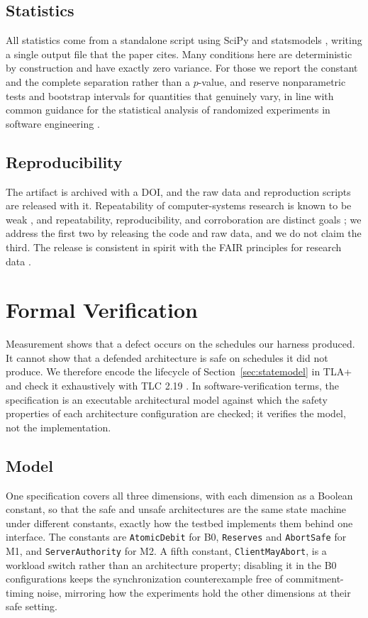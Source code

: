 \documentclass[preprint,3p,authoryear,12pt]{elsarticle}
\begin{document}
\subsection{Statistics}
All statistics come from a standalone script using SciPy \citep{scipy} and statsmodels
\citep{statsmodels}, writing a
single output file that the paper cites. Many conditions here are deterministic by
construction and have exactly zero variance. For those we report the constant and the
complete separation rather than a $p$-value, and reserve nonparametric tests and
bootstrap intervals \citep{efron} for quantities that genuinely vary, in line with common
guidance for the statistical analysis of randomized experiments in software engineering
\citep{arcuri}.

\subsection{Reproducibility}
The artifact is archived with a DOI, and the raw data and reproduction scripts are
released with it. Repeatability of computer-systems research is known to be weak
\citep{collberg}, and repeatability, reproducibility, and corroboration are distinct
goals \citep{feitelson}; we address the first two by releasing the code and raw data, and
we do not claim the third. The release is consistent in spirit with the FAIR principles
for research data \citep{fair}.

\section{Formal Verification}
\label{sec:formal}
Measurement shows that a defect occurs on the schedules our harness produced. It cannot
show that a defended architecture is safe on schedules it did not produce. We therefore
encode the lifecycle of Section~\ref{sec:statemodel} in TLA+ \citep{tla} and check it
exhaustively with TLC 2.19 \citep{tlc}. In software-verification terms, the specification
is an executable architectural model against which the safety properties of each
architecture configuration are checked; it verifies the model, not the implementation.

\subsection{Model}
One specification covers all three dimensions, with each dimension as a Boolean constant,
so that the safe and unsafe architectures are the same state machine under different
constants, exactly how the testbed implements them behind one interface. The constants
are \texttt{AtomicDebit} for B0, \texttt{Reserves} and \texttt{AbortSafe} for M1, and
\texttt{ServerAuthority} for M2. A fifth constant, \texttt{ClientMayAbort}, is a workload
switch rather than an architecture property; disabling it in the B0 configurations keeps
the synchronization counterexample free of commitment-timing noise, mirroring how the
experiments hold the other dimensions at their safe setting.
\end{document}
